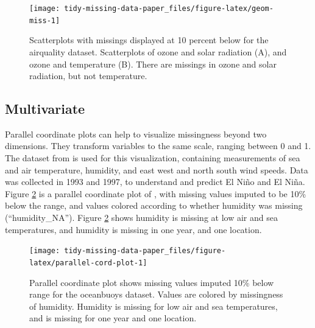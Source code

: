 \documentclass[
]{jss}
\begin{document}
\begin{CodeChunk}
\begin{figure}

{\centering \texttt{[image: tidy-missing-data-paper\_files/figure-latex/geom-miss-1]} 

}

\caption[Scatterplots with missings displayed at 10 percent below for the airquality dataset]{Scatterplots with missings displayed at 10 percent below for the airquality dataset. Scatterplots of ozone and solar radiation (A), and ozone and temperature (B). There are missings in ozone and solar radiation, but not temperature.}\label{fig:geom-miss}
\end{figure}
\end{CodeChunk}

\hypertarget{multivariate}{%
\subsection{Multivariate}\label{multivariate}}

Parallel coordinate plots can help to visualize missingness beyond two dimensions. They transform variables to the same scale, ranging between 0 and 1. The  dataset from  is used for this visualization, containing measurements of sea and air temperature, humidity, and east west and north south wind speeds. Data was collected in 1993 and 1997, to understand and predict El Niño and El Niña. Figure \ref{fig:parallel-cord-plot} is a parallel coordinate plot of , with missing values imputed to be 10\% below the range, and values colored according to whether humidity was missing (``humidity\_NA''). Figure \ref{fig:parallel-cord-plot} shows humidity is missing at low air and sea temperatures, and humidity is missing in one year, and one location.

\begin{CodeChunk}
\begin{figure}

{\centering \texttt{[image: tidy-missing-data-paper\_files/figure-latex/parallel-cord-plot-1]} 

}

\caption[Parallel coordinate plot shows missing values imputed 10\% below range for the oceanbuoys dataset]{Parallel coordinate plot shows missing values imputed 10\% below range for the oceanbuoys dataset. Values are colored by missingness of humidity. Humidity is missing for low air and sea temperatures, and is missing for one year and one location.}\label{fig:parallel-cord-plot}
\end{figure}
\end{CodeChunk}
\end{document}
